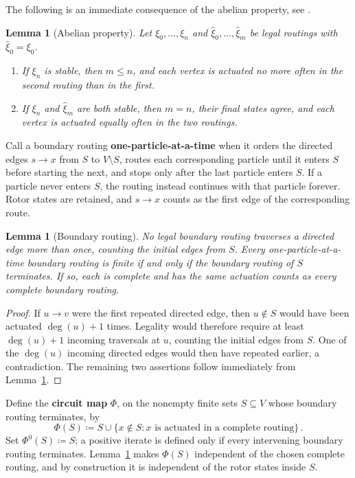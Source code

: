 \documentclass[11pt]{amsart}
\theoremstyle{plain}
\newtheorem{lemma}[theorem]{Lemma}
\theoremstyle{definition}
\newcommand{\defn}[1]{\textbf{#1}}
\begin{document}
	The following is an immediate consequence of the abelian property, see
	\citet[Lemma~3.9]{HolroydLevineMeszarosPeresProppWilson2008}.
	
	
	\begin{lemma}[Abelian property]\label{lem:least-action}
		Let $\xi_0,\ldots,\xi_n$ and
		$\widehat\xi_0,\ldots,\widehat\xi_m$ be legal routings with
		$\widehat\xi_0=\xi_0$.
		\begin{enumerate}[label=\textup{(\alph*)}]
			\item If $\xi_n$ is stable, then $m\leq n$, and each vertex is actuated no
			more often in the second routing than in the first.
			\item If $\xi_n$ and $\widehat\xi_m$ are both stable, then $m=n$, their
			final states agree, and each vertex is actuated equally often in the two
			routings.
		\end{enumerate}
	\end{lemma}
	
	Call a boundary routing \defn{one-particle-at-a-time} when it orders the
	directed edges $s\to x$ from $S$ to $V\setminus S$, routes each corresponding
	particle until it enters $S$ before starting the next, and stops only after the
	last particle enters $S$.  If a particle never enters $S$, the routing instead
	continues with that particle forever.  Rotor states are retained, and
	$s\to x$ counts as the first edge of the corresponding route.
	
	\begin{lemma}[Boundary routing]\label{lem:boundary-routing}
		No legal boundary routing traverses a directed edge more than once, counting
		the initial edges from $S$.  Every one-particle-at-a-time boundary routing is
		finite if and only if the boundary routing of $S$ terminates.  If so, each is
		complete and has the same actuation counts as every complete boundary routing.
	\end{lemma}
	
	\begin{proof}
		If $u\to v$ were the first repeated directed edge, then $u\notin S$ would
		have been actuated $\deg(u)+1$ times.  Legality would therefore require at
		least $\deg(u)+1$ incoming traversals at $u$, counting the initial edges from
		$S$.  One of the $\deg(u)$ incoming directed edges would then
		have repeated earlier, a contradiction. The remaining two assertions follow immediately from Lemma~\ref{lem:least-action}.
	\end{proof}
	
	Define the \defn{circuit map} $\Phi$, on the nonempty finite sets
	$S\subseteq V$ whose boundary routing terminates, by
	\begin{equation}\label{eq:phi-definition}
		\Phi(S)
		\coloneqq
		S\cup\{x\notin S:\text{$x$ is actuated in a complete routing}\}\, .
	\end{equation}
	Set $\Phi^0(S)\coloneqq S$; a positive iterate is defined only if every
	intervening boundary routing terminates.  Lemma~\ref{lem:least-action} makes
	$\Phi(S)$ independent of the chosen complete routing, and by construction it
	is independent of the rotor states inside $S$.
	
\end{document}
